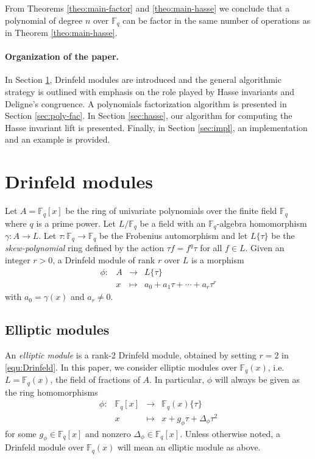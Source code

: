 \documentclass[12pt]{article}
\theoremstyle{plain}
\theoremstyle{definition}
\newcommand{\ang}[1]{\{#1\}}
\def\F{\ensuremath{\mathbb{F}}}
\begin{document}
From Theorems \ref{theo:main-factor} and \ref{theo:main-hasse} we conclude that a polynomial of 
degree $n$ over $\F_q$ can be factor in the same number of operations as in Theorem 
\ref{theo:main-hasse}.

\paragraph{Organization of the paper.}
In Section \ref{sec:drinfeld}, Drinfeld modules are introduced and the general algorithmic 
strategy is outlined with emphasis on the role played by Hasse invariants and Deligne's congruence. 
A polynomials factorization algorithm is presented in Section \ref{sec:poly-fac}. In Section 
\ref{sec:hasse}, our algorithm for computing the Hasse invariant lift is presented. Finally, in 
Section \ref{sec:impl}, an implementation and an example is provided.
 
 
 
 

\section{Drinfeld modules}
\label{sec:drinfeld}

Let $A = \F_q[x]$ be the ring of univariate polynomials over the finite field $\F_q$ where $q$ is a 
prime power. Let $L/\F_q$ be a field with an $\F_q$-algebra homomorphism $\gamma: A \rightarrow 
L$. Let $\tau: \F_q \rightarrow \F_q$ be the Frobenius automorphism and let $L\{\tau\}$ be the 
\textit{skew-polynomial} ring defined by the action $\tau f = f^q\tau$ for all $f \in L$. Given an 
integer $r > 0$, a Drinfeld module of rank $r$ over $L$ is a morphism
\begin{equation}
\label{equ:Drinfeld}
	\begin{array}{rrll}
		\phi : & A & \longrightarrow & L\{\tau\} \\
		& x & \longmapsto & a_0 + a_1\tau + \cdots + a_r\tau^r	
	\end{array}
\end{equation}
with $a_0 = \gamma(x)$ and $a_r \ne 0$. 




\subsection{Elliptic modules}

An \textit{elliptic module} is a rank-2 Drinfeld module, obtained by setting $r = 2$ in 
\eqref{equ:Drinfeld}. In this paper, we consider elliptic modules over $\F_q(x)$, i.e. $L = 
\F_q(x)$, the field of fractions of $A$. In particular, $\phi$ will always be given as the ring 
homomorphisms
\[
\begin{array}{rrll}
	\phi : & \F_q[x] & \longrightarrow & \F_q(x)\ang{\tau} \\
	& x & \longmapsto & x + g_\phi \tau + \Delta_\phi \tau^2	
\end{array}
\]
for some $g_\phi \in \F_q[x]$ and nonzero $\Delta_\phi \in \F_q[x]$. Unless otherwise noted, a 
Drinfeld module over $\F_q(x)$ will mean an elliptic module as above. 
\end{document}
